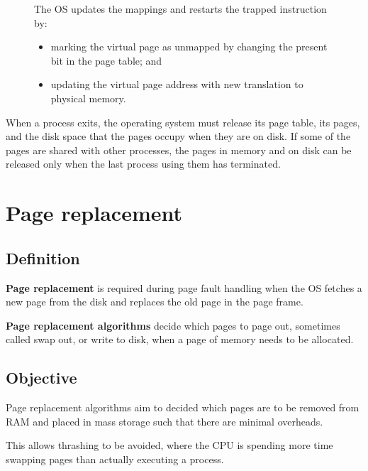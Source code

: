 \documentclass[a4paper]{systems-software}
\begin{document}
\begin{figure}[H]
{\begin{minipage}{\dimexpr \textwidth-2\fboxsep-2\fboxrule}
	The OS updates the mappings and restarts the trapped instruction by:
	\begin{itemize}
		\item marking the virtual page as unmapped by changing the present bit in the page table; and
		\item updating the virtual page address with new translation to physical memory.
	\end{itemize}
  \end{minipage}}
\end{figure}


When a process exits, the operating system must release its page table, its pages, and the disk space that the pages occupy when they are on disk. If some of the pages are shared with other processes, the pages in memory and on disk can be released only when the last process using them has terminated.


\section*{Page replacement}

\subsection*{Definition}

\textbf{Page replacement} is required during page fault handling when the OS fetches a new page from the disk and replaces the old page in the page frame.

\textbf{Page replacement algorithms} decide which pages to page out, sometimes called swap out, or write to disk, when a page of memory needs to be allocated.


\subsection*{Objective}

Page replacement algorithms aim to decided which pages are to be removed from RAM and placed in mass storage such that there are minimal overheads.

This allows thrashing to be avoided, where the CPU is spending more time swapping pages than actually executing a process.
\end{document}
